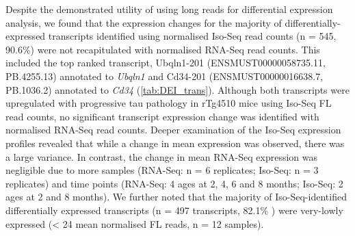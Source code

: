 Despite the demonstrated utility of using long reads for differential expression analysis, we found that the expression changes for the majority of differentially-expressed transcripts identified using normalised Iso-Seq read counts (n = 545, 90.6\%) were not recapitulated with normalised RNA-Seq read counts. This included the top ranked transcript, Ubqln1-201 (ENSMUST00000058735.11, PB.4255.13) annotated to \textit{Ubqln1} and Cd34-201 (ENSMUST00000016638.7, PB.1036.2) annotated to \textit{Cd34} (\cref{tab:DEI_trans}). Although both transcripts were upregulated with progressive tau pathology in rTg4510 mice using Iso-Seq FL read counts, no significant transcript expression change was identified with normalised RNA-Seq read counts. Deeper examination of the Iso-Seq expression profiles revealed that while a change in mean expression was observed, there was a large variance. In contrast, the change in mean RNA-Seq expression was negligible due to more samples (RNA-Seq: n = 6 replicates; Iso-Seq: n = 3 replicates) and time points (RNA-Seq: 4 ages at 2, 4, 6 and 8 months; Iso-Seq: 2 ages at 2 and 8 months). We further noted that the majority of Iso-Seq-identified differentially expressed transcripts (n = 497 transcripts, 82.1\% ) were very-lowly expressed (< 24 mean normalised FL reads, n = 12 samples). 


